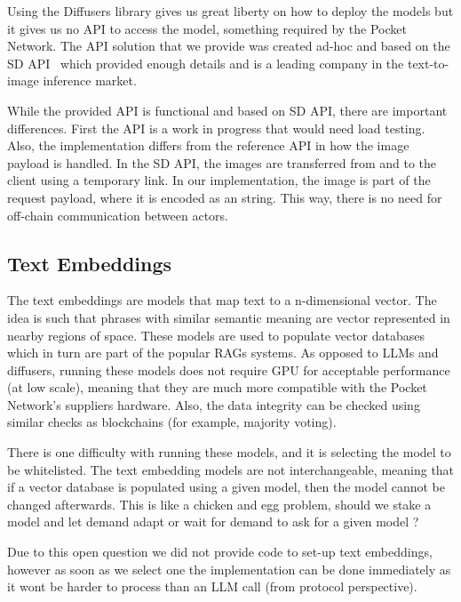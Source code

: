 Using the Diffusers library gives us great liberty on how to deploy the models but it gives us no API to access the model, something required by the Pocket Network. The API solution that we provide was created ad-hoc and based on the \gls{SD} API~\cite{StableDiffusion_API} which provided enough details and is a leading company in the text-to-image inference market.

While the provided API is functional and based on \gls{SD} API, there are important differences. First the API is a work in progress that would need load testing. Also, the implementation differs from the reference API in how the image payload is handled. In the \gls{SD} API, the images are transferred from and to the client using a temporary link. In our implementation, the image is part of the request payload, where it is encoded as an string. This way, there is no need for off-chain communication between actors.

\subsection{Text Embeddings}
The text embeddings are models that map text to a n-dimensional vector. The idea is such that phrases with similar semantic meaning are vector represented in nearby regions of space. These models are used to populate vector databases which in turn are part of the popular \glspl{RAG} systems. As opposed to \glspl{LLM} and diffusers, running these models does not require \gls{GPU} for acceptable performance (at low scale), meaning that they are much more compatible with the Pocket Network's suppliers hardware. Also, the data integrity can be checked using similar checks as blockchains (for example, majority voting).

There is one difficulty with running these models, and it is selecting the model to be whitelisted. The text embedding models are not interchangeable, meaning that if a vector database is populated using a given model, then the model cannot be changed afterwards. This is like a chicken and egg problem, should we stake a model and let demand adapt or wait for demand to ask for a given model ?

Due to this open question we did not provide code to set-up text embeddings, however as soon as we select one the implementation can be done immediately as it wont be harder to process than an \gls{LLM} call (from protocol perspective).



